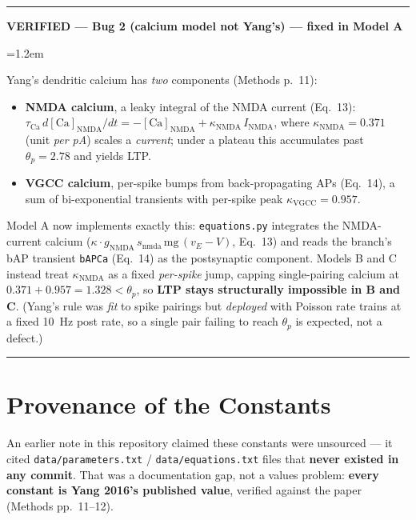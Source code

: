 \documentclass[11pt,a4paper]{article}
\newenvironment{okbox}[1]{%
  \par\medskip\noindent
  \textcolor{okgreen}{\rule{\linewidth}{1.1pt}}\par\nobreak\vspace{2pt}%
  \noindent\textcolor{okgreen}{\textbf{VERIFIED --- #1}}%
  \par\nobreak\vspace{3pt}%
  \begingroup\leftskip=1.2em\relax\small
}{%
  \par\endgroup\vspace{3pt}%
  \noindent\textcolor{okgreen}{\rule{\linewidth}{0.5pt}}\par\medskip
}
\begin{document}
\begin{okbox}{Bug 2 (calcium model not Yang's) --- fixed in Model A}
Yang's dendritic calcium has \emph{two} components (Methods p.~11):
\begin{itemize}
    \item \textbf{NMDA calcium}, a leaky integral of the NMDA current (Eq.~13):
      $\tau_{\text{Ca}}\,d[\text{Ca}]_{\text{NMDA}}/dt = -[\text{Ca}]_{\text{NMDA}}
      + \kappa_{\text{NMDA}}\,I_{\text{NMDA}}$, where $\kappa_{\text{NMDA}}=0.371$ (unit
      \emph{per pA}) scales a \emph{current}; under a plateau this accumulates past
      $\theta_p=2.78$ and yields LTP.
    \item \textbf{VGCC calcium}, per-spike bumps from back-propagating APs (Eq.~14), a sum
      of bi-exponential transients with per-spike peak $\kappa_{\text{VGCC}}=0.957$.
\end{itemize}
Model A now implements exactly this: \texttt{equations.py} integrates the NMDA-current
calcium ($\kappa\cdot g_{\text{NMDA}}\,s_{\text{nmda}}\,\text{mg}\,(v_E-V)$, Eq.~13) and
reads the branch's bAP transient \texttt{bAPCa} (Eq.~14) as the postsynaptic component.
Models B and C instead treat $\kappa_{\text{NMDA}}$ as a fixed \emph{per-spike} jump,
capping single-pairing calcium at $0.371+0.957=1.328<\theta_p$, so \textbf{LTP stays
structurally impossible in B and C}. (Yang's rule was \emph{fit} to spike pairings but
\emph{deployed} with Poisson rate trains at a fixed 10~Hz post rate, so a single pair
failing to reach $\theta_p$ is expected, not a defect.)
\end{okbox}

\section{Provenance of the Constants}
\label{sec:provenance}
An earlier note in this repository claimed these constants were unsourced --- it cited
\texttt{data/parameters.txt} / \texttt{data/equations.txt} files that \textbf{never existed
in any commit}. That was a documentation gap, not a values problem: \textbf{every constant
is Yang 2016's published value}, verified against the paper (Methods pp.~11--12).
\end{document}
